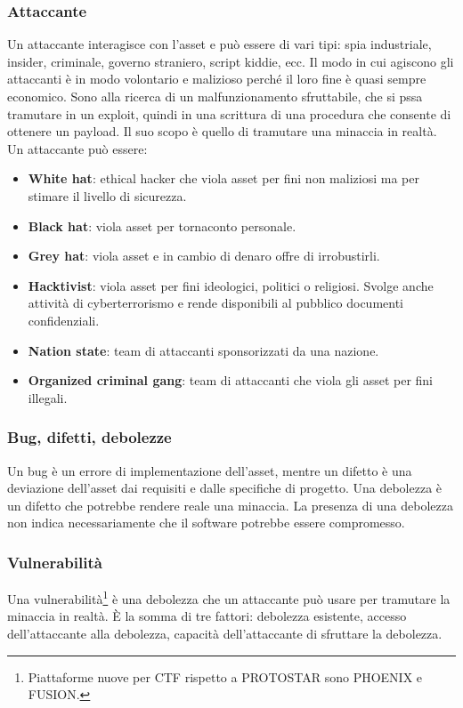 \subsubsection{Attaccante}
Un attaccante interagisce con l'asset e può essere di vari tipi: spia industriale, insider, criminale, governo straniero, script kiddie, ecc. Il modo in cui agiscono gli attaccanti è in modo volontario e malizioso perché il loro fine è quasi sempre economico. Sono alla ricerca di un malfunzionamento sfruttabile, che si pssa tramutare in un exploit, quindi in una scrittura di una procedura che consente di ottenere un payload. Il suo scopo è quello di tramutare una minaccia in realtà. Un attaccante può essere:
\begin{itemize}
    \item \textbf{White hat}: ethical hacker che viola asset per fini non maliziosi ma per stimare il livello di sicurezza.
    \item \textbf{Black hat}: viola asset per tornaconto personale.
    \item \textbf{Grey hat}: viola asset e in cambio di denaro offre di irrobustirli.
    \item \textbf{Hacktivist}: viola asset per fini ideologici, politici o religiosi. Svolge anche attività di cyberterrorismo e rende disponibili al pubblico documenti confidenziali.
    \item \textbf{Nation state}: team di attaccanti sponsorizzati da una nazione.
    \item \textbf{Organized criminal gang}: team di attaccanti che viola gli asset per fini illegali.
\end{itemize}

\subsubsection{Bug, difetti, debolezze}
Un bug è un errore di implementazione dell'asset, mentre un difetto è una deviazione dell'asset dai requisiti e dalle specifiche di progetto. Una debolezza è un difetto che potrebbe rendere reale una minaccia. La presenza di una debolezza non indica necessariamente che il software potrebbe essere compromesso.

\subsubsection{Vulnerabilità}
Una vulnerabilità\footnote{Piattaforme nuove per CTF rispetto a PROTOSTAR sono PHOENIX e FUSION.} è una debolezza che un attaccante può usare per tramutare la minaccia in realtà. È la somma di tre fattori: debolezza esistente, accesso dell'attaccante alla debolezza, capacità dell'attaccante di sfruttare la debolezza.

